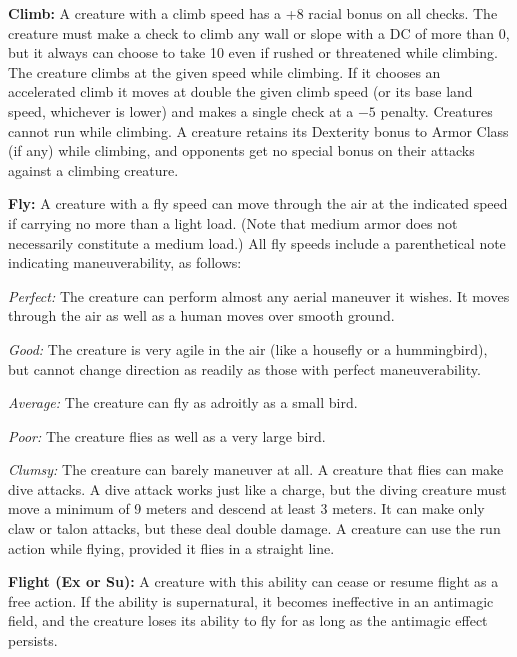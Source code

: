 \textbf{Climb:} A creature with a climb speed has a +8 racial bonus on all  checks. The creature must make a  check to climb any wall or slope with a DC of more than 0, but it always can choose to take 10 even if rushed or threatened while climbing. The creature climbs at the given speed while climbing. If it chooses an accelerated climb it moves at double the given climb speed (or its base land speed, whichever is lower) and makes a single  check at a $-5$ penalty. Creatures cannot run while climbing. A creature retains its Dexterity bonus to Armor Class (if any) while climbing, and opponents get no special bonus on their attacks against a climbing creature.

\textbf{Fly:} A creature with a fly speed can move through the air at the indicated speed if carrying no more than a light load. (Note that medium armor does not necessarily constitute a medium load.) All fly speeds include a parenthetical note indicating maneuverability, as follows:

\begin{itemize*}
\item \textit{Perfect:} The creature can perform almost any aerial maneuver it wishes. It moves through the air as well as a human moves over smooth ground.
\item \textit{Good:} The creature is very agile in the air (like a housefly or a hummingbird), but cannot change direction as readily as those with perfect maneuverability.
\item \textit{Average:} The creature can fly as adroitly as a small bird.
\item \textit{Poor:} The creature flies as well as a very large bird.
\item \textit{Clumsy:} The creature can barely maneuver at all.
A creature that flies can make dive attacks. A dive attack works just like a charge, but the diving creature must move a minimum of 9 meters and descend at least 3 meters. It can make only claw or talon attacks, but these deal double damage. A creature can use the run action while flying, provided it flies in a straight line.
\end{itemize*}

\textbf{Flight (Ex or Su):} A creature with this ability can cease or resume flight as a free action. If the ability is supernatural, it becomes ineffective in an antimagic field, and the creature loses its ability to fly for as long as the antimagic effect persists.

